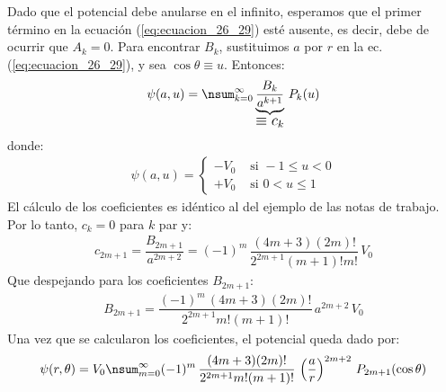 Dado que el potencial debe anularse en el infinito, esperamos que el primer término en la ecuación (\ref{eq:ecuacion_26_29}) esté ausente, es decir, debe de ocurrir que $A_{k} = 0$. Para encontrar $B_{k}$, sustituimos $a$ por $r$ en la ec. (\ref{eq:ecuacion_26_29}), y sea $\cos \theta \equiv u$. Entonces:
\begin{align*}
\psi (a, u) = \nsum_{k=0}^{\infty} \underbrace{\dfrac{B_{k}}{a^{k+1}}}_{\mbox{\large $\equiv c_{k}$}} \, P_{k} (u)
\end{align*}
donde:
\begin{align*}
\psi (a, u) = \begin{cases}
- V_{0} & \mbox{ si } -1 \leq u < 0 \\[1em]
+ V_{0} & \mbox{ si } 0 < u \leq 1
\end{cases}
\end{align*}
El cálculo de los coeficientes es idéntico al del ejemplo de las notas de trabajo. Por lo tanto, $c_{k} = 0$ para $k$ par y:
\begin{align*}
c_{2m+1} = \dfrac{B_{2m+1}}{a^{2m+2}} = (-1)^{m} \, \dfrac{(4 m + 3)(2 m)!}{2^{2m+1} (m + 1)! m!} \, V_{0}
\end{align*}
Que despejando para los coeficientes $B_{2m+1}$:
\begin{align*}
B_{2m+1} = \dfrac{(-1)^{m} \, (4 m + 3)(2 m)!}{2^{2m+1} m! (m + 1)!} \, a^{2m+2} \, V_{0}
\end{align*}
Una vez que se calcularon los coeficientes, el potencial queda dado por:
\begin{align}
\psi (r, \theta) = V_{0} \nsum_{m=0}^{\infty} (-1)^{m} \, \dfrac{(4 m + 3)(2 m)!}{2^{2m+1} m! (m + 1)!} \, \left( \dfrac{a}{r} \right)^{2m+2} \, P_{2m+1} (\cos \theta)
\label{eq:ecuacion:26_53}
\end{align}



